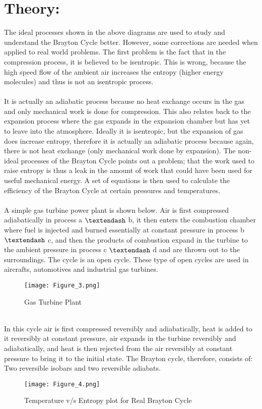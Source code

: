 \documentclass[12pt,a4paper]{article}
\begin{document}
\section{Theory:}
The ideal processes shown in the above diagrams are used to study and understand the Brayton Cycle better. However, some corrections are needed when applied to real world problems. The first problem is the fact that in the compression process, it is believed to be isentropic. This is wrong, because the high speed flow of the ambient air increases the entropy (higher energy molecules) and thus is not an isentropic process.\\
\\It is actually an adiabatic process because no heat exchange occurs in the gas and only mechanical work is done for compression. This also relates back to the expansion process where the gas expands in the expansion chamber but has yet to leave into the atmosphere. Ideally it is isentropic, but the expansion of gas does increase entropy, therefore it is actually an adiabatic process because again, there is not heat exchange (only mechanical work done by expansion). The non-ideal processes of the Brayton Cycle points out a problem; that the work used to raise
entropy is thus a leak in the amount of work that could have been used for useful mechanical energy. A set of equations is then used to calculate the efficiency of the Brayton Cycle at certain pressures and temperatures.\\
\\A simple gas turbine power plant is shown below. Air is first compressed adiabatically in process a $\textendash$ b, it then enters the combustion chamber where fuel is injected and burned essentially at constant pressure in process b $\textendash$ c, and then the products of combustion expand in the turbine to the ambient pressure in process c $\textendash$ d and are thrown out to the surroundings. The cycle is an open cycle. These type of open cycles are used in aircrafts, automotives and industrial gas turbines.\\
\begin{figure}[!ht]
	\begin{center}
		\texttt{[image: Figure\_3.png]}
	\end{center}
	\caption{Gas Turbine Plant}
\end{figure}\\
In this cycle air is first compressed reversibly and adiabatically, heat is added to it reversibly at constant pressure, air expands in the turbine reversibly and adiabatically, and heat is then rejected from the air reversibly at constant pressure to bring it to the initial state. The Brayton cycle, therefore, consists of: Two reversible isobars and two reversible adiabats.
\clearpage
\begin{figure}[!ht]
	\begin{center}
		\texttt{[image: Figure\_4.png]}
	\end{center}
	\caption{Temperature v/s Entropy plot for Real Brayton Cycle}
\end{figure}
\end{document}
